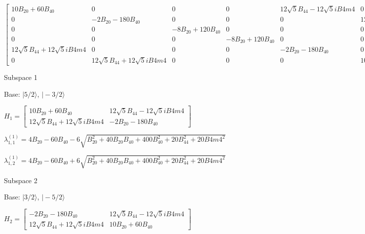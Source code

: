 \documentclass[8pt]{report}
\begin{document}
\begin{math}
\left[\begin{matrix}10 B_{20} + 60 B_{40} & 0 & 0 & 0 & 12 \sqrt{5} B_{44} - 12 \sqrt{5} i B4m4 & 0\\0 & - 2 B_{20} - 180 B_{40} & 0 & 0 & 0 & 12 \sqrt{5} B_{44} - 12 \sqrt{5} i B4m4\\0 & 0 & - 8 B_{20} + 120 B_{40} & 0 & 0 & 0\\0 & 0 & 0 & - 8 B_{20} + 120 B_{40} & 0 & 0\\12 \sqrt{5} B_{44} + 12 \sqrt{5} i B4m4 & 0 & 0 & 0 & - 2 B_{20} - 180 B_{40} & 0\\0 & 12 \sqrt{5} B_{44} + 12 \sqrt{5} i B4m4 & 0 & 0 & 0 & 10 B_{20} + 60 B_{40}\end{matrix}\right]
\end{math}

Subspace 1

Base: $\vert 5/2 \rangle$, $\vert -3/2 \rangle$

\begin{math}
H_{1} = 
\left[\begin{matrix}10 B_{20} + 60 B_{40} & 12 \sqrt{5} B_{44} - 12 \sqrt{5} i B4m4\\12 \sqrt{5} B_{44} + 12 \sqrt{5} i B4m4 & - 2 B_{20} - 180 B_{40}\end{matrix}\right]
\end{math}

\begin{math}
\lambda_{1,1}^{(1)} = 
4 B_{20} - 60 B_{40} - 6 \sqrt{B_{20}^{2} + 40 B_{20} B_{40} + 400 B_{40}^{2} + 20 B_{44}^{2} + 20 B4m4^{2}}
\end{math}

\begin{math}
\lambda_{1,2}^{(1)} = 
4 B_{20} - 60 B_{40} + 6 \sqrt{B_{20}^{2} + 40 B_{20} B_{40} + 400 B_{40}^{2} + 20 B_{44}^{2} + 20 B4m4^{2}}
\end{math}



Subspace 2

Base: $\vert 3/2 \rangle$, $\vert -5/2 \rangle$

\begin{math}
H_{2} = 
\left[\begin{matrix}- 2 B_{20} - 180 B_{40} & 12 \sqrt{5} B_{44} - 12 \sqrt{5} i B4m4\\12 \sqrt{5} B_{44} + 12 \sqrt{5} i B4m4 & 10 B_{20} + 60 B_{40}\end{matrix}\right]
\end{math}
\end{document}
